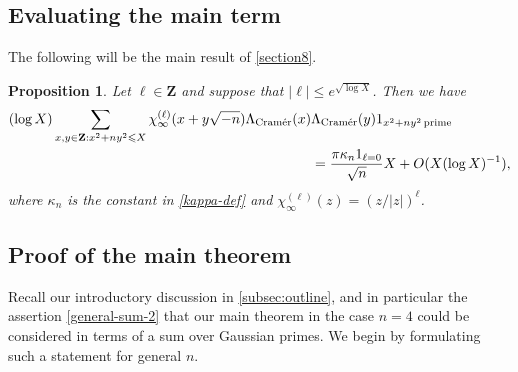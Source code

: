 \documentclass[11pt,reqno]{amsart}
\numberwithin{equation}{section}
\newtheorem{proposition}[theorem]{Proposition}
\theoremstyle{definition}
\theoremstyle{remark}
\renewcommand{\le}{\leqslant}
\newcommand\Z{\mathbf{Z}}
\newcommand\cramer{{\textnormal{Cram\'er}}}
\begin{document}
\subsection{Evaluating the main term}

The following will be the main result of \cref{section8}.

\begin{proposition}\label{prop:main-term-comp} Let $\ell \in \Z$ and suppose that $|\ell| \le e^{\sqrt{\log X}}$. Then we have
\begin{align*}(\log X) \sum_{x,y \in \Z : x^2 + ny^2\le X}
\chi_{\infty}^{(\ell)}(x + y \sqrt{-n})\Lambda_{\cramer}(x)& \Lambda_{\cramer}(y) 1_{x^2 + ny^2 \operatorname{prime}} \\ & = \frac{\pi \kappa_n 1_{\ell = 0}}{\sqrt{n}} X + O( X (\log X)^{-1}),\end{align*}
where $\kappa_n$ is the constant in \cref{kappa-def} and $\chi_{\infty}^{(\ell)}(z) = (z/|z|)^{\ell}$. 
\end{proposition}

\subsection{Proof of the main theorem}


Recall our introductory discussion in \cref{subsec:outline}, and in particular the assertion \cref{general-sum-2} that our main theorem in the case $n = 4$ could be considered in terms of a sum over Gaussian primes. We begin by formulating such a statement for general $n$.  
\end{document}
